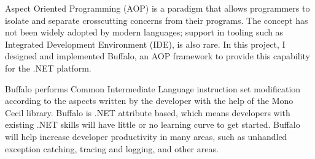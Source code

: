 \begin{abstractpage}
Aspect Oriented Programming (AOP) is a paradigm that allows programmers to isolate and separate crosscutting concerns from their programs. The concept has not been widely adopted by modern languages; support in tooling such as Integrated Development Environment (IDE), is also rare. In this project, I designed and implemented Buffalo, an AOP framework to provide this capability for the .NET platform.

Buffalo performs Common Intermediate Language instruction set modification according to the aspects written by the developer with the help of the Mono Cecil library. Buffalo is .NET attribute based, which means developers with existing .NET skills will have little or no learning curve to get started. Buffalo will help increase developer productivity in many areas, such as unhandled exception catching, tracing and logging, and other areas.
\end{abstractpage}
